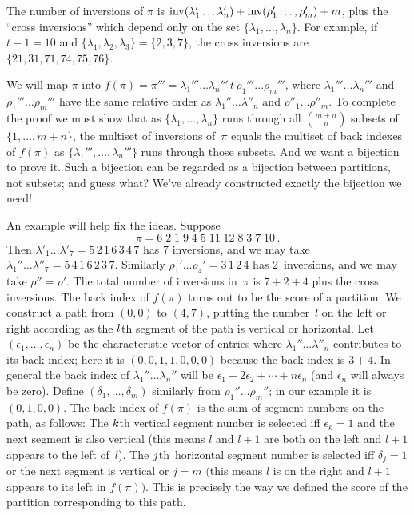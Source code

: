 The number of inversions of $\pi$ is ${\rm inv}(\lambda_1'\ldots\lambda'_n)
+{\rm inv}(\rho'_1\ldots,\rho'_m)+m$, plus the ``cross inversions'' which
depend only on the set $\{\lambda_1,\ldots,\lambda_n\}$. For example, if
$t-1=10$ and $\{\lambda_1,\lambda_2,\lambda_3\}=\{2,3,7\}$, the cross
inversions are $\{21,31,71,74,75,76\}$.

We will map $\pi$ into
$f(\pi)=\pi'''=\lambda_1'''\ldots\lambda_n'''\,t\,\rho_1'''\ldots\rho_m'''$, 
where $\lambda_1'''\ldots\lambda_n'''$ and $\rho_1'''\ldots\rho_m'''$
have the same relative order as $\lambda_1''\ldots\lambda''_n$ and
$\rho''_1\ldots\rho''_m$. To
complete the proof we must show that as $\{\lambda_1,\ldots,\lambda_n\}$ runs
through 
 all ${m+n\choose n}$ subsets of $\{1,\ldots,m+n\}$, the multiset of
inversions of~$\pi$ equals the  multiset of back indexes of
$f(\pi)$ as $\{\lambda_1''',\ldots,\lambda_n'''\}$ runs through those subsets.
And we want a bijection to prove it. Such a bijection can be regarded as a
bijection between partitions, not subsets; and guess what? We've already
constructed exactly the bijection we need!

An example will help fix the ideas. Suppose
$$\pi=6\;2\;1\;9\;4\;5\;11\;12\;8\;3\;7\;10\,.$$
Then $\lambda'_1\ldots\lambda'_7=5\,2\,1\,6\,3\,4\,7$ has 7 inversions, and we
may take $\lambda_1''\ldots\lambda''_7=5\,4\,1\,6\,2\,3\,7$. Similarly
$\rho_1'\ldots\rho_4'=3\,1\,2\,4$ has 2~inversions, and we may take
$\rho''=\rho'$. The total number of inversions in~$\pi$ is $7+2+4$ plus the
cross inversions. The back index of $f(\pi)$ turns out to be the score of a
partition: We construct a path from $(0,0)$ to $(4,7)$, putting the number~$l$
on the left or right
 according as the $l\/$th segment of the path is vertical or
horizontal. Let $(\epsilon_1,\ldots,\epsilon_n)$ be the characteristic vector
of entries where $\lambda_1''\ldots\lambda''_n$ contributes to its back index;
here it is $(0,0,1,1,0,0,0)$ because the back index is $3+4$. In general the
back index of $\lambda_1''\ldots\lambda_n''$ will be $\epsilon_1+2\epsilon_2
+\cdots+n\epsilon_n$ (and $\epsilon_n$ will always be zero). Define
$(\delta_1,\ldots,\delta_m)$ similarly from $\rho_1''\ldots\rho_m''$; in our
example it is $(0,1,0,0)$. The back index of $f(\pi)$  is the sum of segment
numbers on the path, as follows: The $k\/$th vertical segment number is
selected iff $\epsilon_k=1$ and the next segment is also vertical (this means
$l$ and $l+1$ are both on the left and $l+1$ appears to the left of~$l$). The
$j\/$th~horizontal segment number is selected iff $\delta_j=1$ or the next
segment is vertical or $j=m$ $\bigl($this 
means $l$ is on the right and $l+1$ appears 
to its left in $f(\pi)\bigr)$. This is precisely the way we defined the score
of the partition corresponding to this path.

